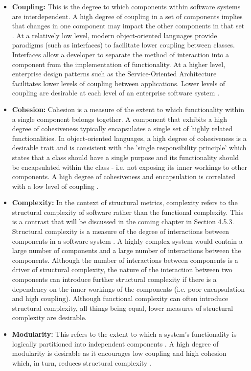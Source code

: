 \begin{itemize}
\item \textbf{Coupling:} This is the degree to which components within software systems are interdependent. A high degree of coupling in a set of components implies that changes in one component may impact the other components in that set \citep{parnas1972criteria}. At a relatively low level, modern object-oriented languages provide paradigms (such as interfaces) to facilitate lower coupling between classes. Interfaces allow a developer to separate the method of interaction into a component from the implementation of functionality. At a higher level, enterprise design patterns such as the Service-Oriented Architecture facilitates lower levels of coupling between applications. Lower levels of coupling are desirable at each level of an enterprise software system \citep{pressman2005software} \citep{chidamber1998managerial}.

\item \textbf{Cohesion:} Cohesion is a measure of the extent to which functionality within a single component belongs together. A component that exhibits a high degree of cohesiveness typically encapsulates a single set of highly related functionalities. In object-oriented languages, a high degree of cohesiveness is a desirable trait and is consistent with the 'single responsibility principle' which states that a class should have a single purpose and its functionality should be encapsulated within the class - i.e. not exposing its inner workings to other components\citep{fenton2014software}. A high degree of cohesiveness and encapsulation is correlated with a low level of coupling \citep{chidamber1998managerial}.

\item \textbf{Complexity:} In the context of structural metrics, complexity refers to the structural complexity of software rather than the functional complexity. This is a contrast that will be discussed in the coming chapter in Section 4.5.3. Structural complexity is a measure of the degree of interactions between components in a software system \citep{fenton2014software}. A highly complex system would contain a large number of components and a large number of interactions between the components. Although the number of interactions between components is a driver of structural complexity, the nature of the interaction between two components can introduce further structural complexity if there is a dependency on the inner workings of the components (i.e. poor encapsulation and high coupling). Although functional complexity can often introduce structural complexity, all things being equal, lower measures of structural complexity are desirable.

\item \textbf{Modularity:} This refers to the extent to which a system's functionality is logically partitioned into independent components \citep{parnas1972criteria}. A high degree of modularity is desirable as it encourages low coupling and high cohesion which, in turn, reduces structural complexity \citep{parnas1972criteria} \citep{sullivan2001structure}.
\end{itemize}

